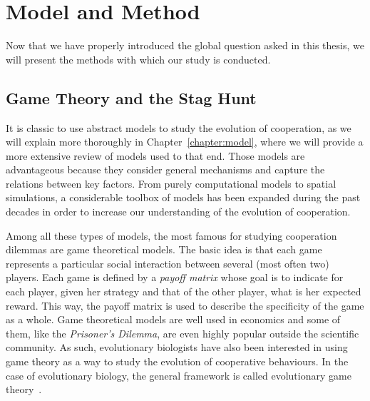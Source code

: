 



\section{Model and Method}

  Now that we have properly introduced the global question asked in this thesis, we will present the methods with which our study is conducted.
  
  \subsection{Game Theory and the Stag Hunt}

    It is classic to use abstract models to study the evolution of cooperation, as we will explain more thoroughly in Chapter~\ref{chapter:model}, where we will provide a more extensive review of models used to that end. Those models are advantageous because they consider general mechanisms and capture the relations between key factors. From purely computational models to spatial simulations, a considerable toolbox of models has been expanded during the past decades in order to increase our understanding of the evolution of cooperation.

    Among all these types of models, the most famous for studying cooperation dilemmas are game theoretical models. The basic idea is that each game represents a particular social interaction between several (most often two) players. Each game is defined by a \emph{payoff matrix} whose goal is to indicate for each player, given her strategy and that of the other player, what is her expected reward. This way, the payoff matrix is used to describe the specificity of the game as a whole. Game theoretical models are well used in economics and some of them, like the \emph{Prisoner's Dilemma}, are even highly popular outside the scientific community. As such, evolutionary biologists have also been interested in using game theory as a way to study the evolution of cooperative behaviours. In the case of evolutionary biology, the general framework is called evolutionary game theory~\parencite{MaynardSmith1973}.

